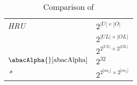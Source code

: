  \begin{table}
 	\centering
 	\caption{Comparison of \policySpace{}}
 	\label{tab:policyspace-comparison}
 	\begin{tabular}{|l|l|}
 		 \hline
 		\textit{HRU \cite{hru}} & $ 2 ^{|U| \times |O|}$ \\
 		\textit{\labacOneOneOne{} } & $ 2 ^{|UL| \times |OL|}$ \\
 		\textit{\elabac} & $ 2 ^{2^{|UL|} \times 2^{|OL|}}$ \\
 		\textit{$\abacAlpha{} \cite{abacAlpha}$} & $2 ^{32}$ \\
 		\textit{\hgabac{}* \cite{hgabac}} & $ 2 ^{2^{|ua_1|} \times 2^{|oa_1|}}$ \\
\hline
 	\end{tabular}
 \end{table} 